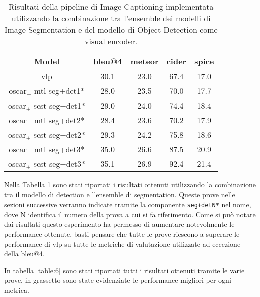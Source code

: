 \begin{table}[H]
\footnotesize
\begin{center}
\begin{tabular}{||c c c c c||} 
 \hline
 \textbf{Model} & \textbf{\acrshort{bleu}@4} & \textbf{\acrshort{meteor}} & \textbf{\acrshort{cider}} & \textbf{\acrshort{spice}}\\ [0.5ex] 
 \hline\hline
 \acrshort{vlp} \cite{zhou2020unified} & 30.1 & 23.0 & 67.4 & 17.0\\
 \hline
 \acrshort{oscar}$_+$ \acrshort{mtl} seg+det1* & 28.0 & 23.5 & 70.0 & 17.7\\
 \hline
 \acrshort{oscar}$_+$ \acrshort{scst} seg+det1* & 29.0 & 24.0 & 74.4 & 18.4\\
 \hline
 \acrshort{oscar}$_+$ \acrshort{mtl} seg+det2* & 28.4 & 23.6 & 70.2 & 17.9\\
 \hline
 \acrshort{oscar}$_+$ \acrshort{scst} seg+det2* & 29.3 & 24.2 & 75.8 & 18.6\\
 \hline
 \acrshort{oscar}$_+$ \acrshort{mtl} seg+det3* & 35.0 & 26.6 & 87.5 & 20.9\\
 \hline
 \acrshort{oscar}$_+$ \acrshort{scst} seg+det3* & 35.1 & 26.9 & 92.4 & 21.4\\
 \hline
\end{tabular}
\caption{Risultati della pipeline di Image Captioning implementata utilizzando la combinazione tra l'ensemble dei modelli di Image Segmentation e del modello di Object Detection come visual encoder.}
\label{table:5}
\end{center}
\end{table}

Nella Tabella \ref{table:5} sono stati riportati i risultati ottenuti utilizzando la combinazione tra il modello di detection e l'ensemble di segmentation. Queste prove nelle sezioni successive verranno indicate tramite la componente \texttt{seg+detN*} nel nome, dove N identifica il numero della prova a cui si fa riferimento. Come si può notare dai risultati questo esperimento ha permesso di aumentare notevolmente le performance ottenute, basti pensare che tutte le prove riescono a superare le performance di \acrshort{vlp} su tutte le metriche di valutazione utilizzate ad eccezione della \acrshort{bleu}@4.


In tabella \ref{table:6} sono stati riportati tutti i risultati ottenuti tramite le varie prove, in grassetto sono state evidenziate le performance migliori per ogni metrica.


